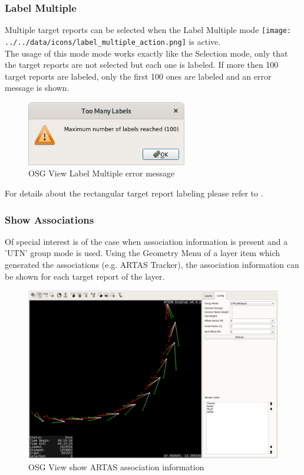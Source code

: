 \subsubsection{Label Multiple}

Multiple target reports can be selected when the Label Multiple mode \texttt{[image: ../../data/icons/label\_multiple\_action.png]} is active. \\

The usage of this mode mode works exactly like the Selection mode, only that the target reports are not selected but each one is labeled. If more then 100 target reports are labeled, only the first 100 ones are labeled and an error message is shown.

\begin{figure}[H]
    \center
    \includegraphics[width=7cm]{figures/osgview_label_multiple_error.png}
  \caption{OSG View Label Multiple error message}
\end{figure}

For details about the rectangular target report labeling please refer to .

\subsubsection{Show Associations}

Of special interest is of the case when association information is present and a 'UTN' group mode is used. Using the Geometry Menu of a layer item which generated the associations (e.g. ARTAS Tracker), the association information can be shown for each target report of the layer.

\begin{figure}[H]
    \hspace*{-2.5cm}
    \includegraphics[width=19cm]{figures/osgview_assoc.png}
  \caption{OSG View show ARTAS association information}
\end{figure}

